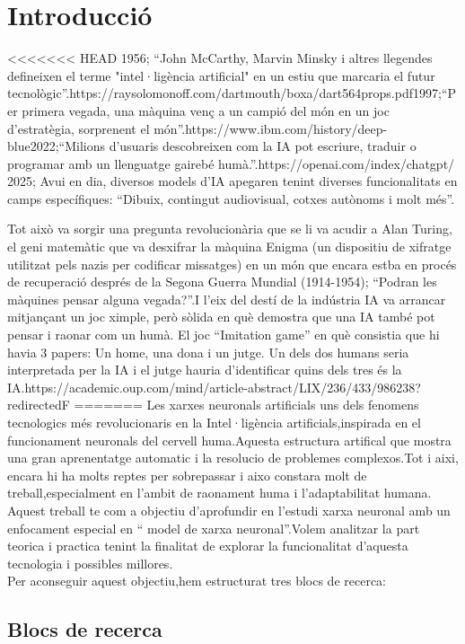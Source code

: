 \chapter{Introducció}
\label{c:intro}
<<<<<<< HEAD
1956; ``John McCarthy, Marvin Minsky i altres llegendes defineixen el terme "intel·ligència artificial" en un estiu que marcaria el futur tecnològic''.{https://raysolomonoff.com/dartmouth/boxa/dart564props.pdf}1997;``Per primera vegada, una màquina venç a un campió del món en un joc d'estratègia, sorprenent el món''.{https://www.ibm.com/history/deep-blue}2022;``Milions d'usuaris descobreixen com la IA pot escriure, traduir o programar amb un llenguatge gairebé humà.''.{https://openai.com/index/chatgpt/} 2025;  Avui en dia, diversos models d'IA apegaren tenint diverses funcionalitats en camps específiques: ``Dibuix, contingut audiovisual, cotxes autònoms i molt més''.

Tot això va sorgir una pregunta revolucionària que se li va acudir a Alan Turing, el geni matemàtic que va desxifrar la màquina Enigma (un dispositiu de xifratge utilitzat pels nazis per codificar missatges) en un món que encara estba en procés de recuperació després de la Segona Guerra Mundial (1914-1954); ``Podran les màquines pensar alguna vegada?''.I l'eix del destí de la indústria IA va arrancar mitjançant un joc ximple, però sòlida en què demostra que una IA també pot pensar i raonar com un humà. El joc ``Imitation game'' en què consistia que hi havia 3 papers: Un home, una dona i un jutge. Un dels dos humans seria interpretada per la IA i el jutge hauria d'identificar quins dels tres és la IA.{https://academic.oup.com/mind/article-abstract/LIX/236/433/986238?redirectedF}
=======
Les xarxes neuronals artificials uns dels fenomens tecnologics més revolucionaris en la Intel·ligència artificials,inspirada en el funcionament neuronals del cervell huma.Aquesta estructura artifical que mostra una gran aprenentatge automatic i la resolucio de problemes complexos.Tot i aixi, encara hi ha molts reptes per sobrepassar i aixo constara molt de treball,especialment en l'ambit de raonament huma i l'adaptabilitat humana.\\
Aquest treball te com a objectiu d'aprofundir en l'estudi xarxa neuronal amb un enfocament especial en `` model de xarxa neuronal''.Volem analitzar la part teorica i practica tenint la finalitat de explorar la funcionalitat d'aquesta tecnologia i possibles millores.\\
Per aconseguir aquest objectiu,hem estructurat tres blocs de recerca:
\section{Blocs de recerca}
